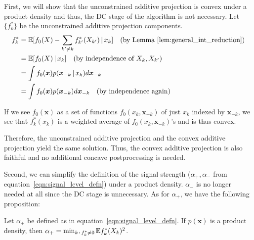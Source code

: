 First, we will show that the unconstrained additive projection is convex under a product density and thus, the DC stage of the algorithm is not necessary. Let $\{ f^*_k \}$ be the unconstrained additive projection components.
\begin{align*}
 f^*_k &= {\mathbb E}[ f_0(X) - \sum_{k' \neq k} f^*_{k'}(X_{k'}) {\,|\,} x_k ] \quad 
\textrm{(by Lemma~\ref{lem:general_int_reduction})} \\
     &= {\mathbb E}[ f_0(X) {\,|\,} x_k ] \quad \textrm{(by independence of $X_k, X_{k'}$)} \\
  &= \int f_0(\mbox{\boldmath $x$}) p(\mbox{\boldmath $x$}_{-k} {\,|\,} x_k ) d \mbox{\boldmath $x$}_{-k} \\
  &= \int f_0(\mbox{\boldmath $x$}) p(\mbox{\boldmath $x$}_{-k}) d\mbox{\boldmath $x$}_{-k} \quad
   \textrm{(by independence again)}
\end{align*}

If we see $f_0(\mathbf{x})$ as a set of functions $f_0(x_k, \mathbf{x}_{-k})$ of just $x_k$ indexed by $\mathbf{x}_{-k}$, we see that $f^*_k(x_k)$ is a weighted average of $f_0(x_k, \mathbf{x}_{-k})$'s and is thus convex. 

Therefore, the unconstrained additive projection and the convex additive projection yield the same solution. Thus, the convex additive projection is also faithful and no additional concave postprocessing is needed.  

Second, we can simplify the definition of the signal strength ($\alpha_+, \alpha_-$ from equation~\ref{eqn:signal_level_defn}) under a product density. $\alpha_-$ is no longer needed at all since the DC stage is unnecessary. As for $\alpha_+$, we have the following proposition:

\begin{proposition}
Let $\alpha_+$ be defined as in equation~\ref{eqn:signal_level_defn}. If $p(\mathbf{x})$ is a product density, then $\alpha_+ = \min_{k \,:\, f^*_k \neq 0} {\mathbb E} f^*_k(X_k)^2$. 
\end{proposition}

